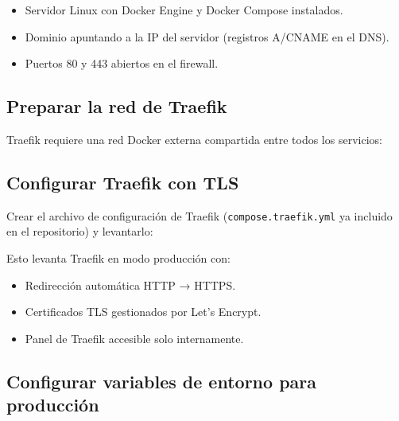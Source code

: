 \begin{itemize}
\tightlist
\item
  Servidor Linux con Docker Engine y Docker Compose instalados.
\item
  Dominio apuntando a la IP del servidor (registros A/CNAME en el DNS).
\item
  Puertos 80 y 443 abiertos en el firewall.
\end{itemize}

\subsection{Preparar la red de Traefik}\label{preparar-la-red-de-traefik}

Traefik requiere una red Docker externa compartida entre todos los servicios:

\begin{Shaded}
\begin{Highlighting}[]
\end{Highlighting}
\end{Shaded}

\subsection{Configurar Traefik con TLS}\label{configurar-traefik-con-tls}

Crear el archivo de configuración de Traefik (\texttt{compose.traefik.yml} ya incluido en el repositorio) y levantarlo:

\begin{Shaded}
\begin{Highlighting}[]
\end{Highlighting}
\end{Shaded}

Esto levanta Traefik en modo producción con:

\begin{itemize}
\tightlist
\item
  Redirección automática HTTP → HTTPS.
\item
  Certificados TLS gestionados por Let's Encrypt.
\item
  Panel de Traefik accesible solo internamente.
\end{itemize}

\subsection{Configurar variables de entorno para producción}\label{configurar-variables-de-entorno-para-producciuxf3n}

